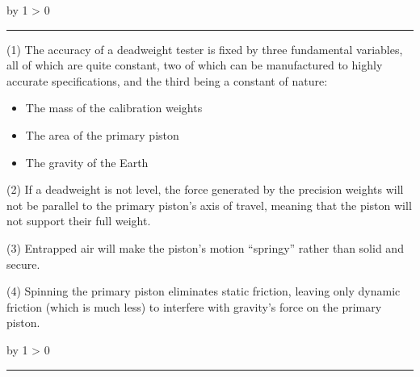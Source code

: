 \documentclass[12pt,a4paper]{article}
\def\svar{
           \advance\answnum by 1
           \ifnum \answnum > 0
                \hrule
                \vskip 3pt
                \leftline{Svar \the\answnum}
                \vskip 3pt \fi}
\def\notes{
           \advance\explnum by 1
           \ifnum \explnum > 0
                \hrule
                \vskip 3pt
                \leftline{Notes \the\explnum}
                \vskip 3pt \fi}
\begin{document}
\vskip 10pt \filbreak 





\svar{} 

\vskip 10pt {\narrower \noindent \baselineskip5pt

\noindent
(1) The accuracy of a deadweight tester is fixed by three fundamental variables, all of which are quite constant, two of which can be manufactured to highly accurate specifications, and the third being a constant of nature:

\begin{itemize}
\item{} The mass of the calibration weights
\item{} The area of the primary piston
\item{} The gravity of the Earth
\end{itemize}

\par} \vskip 10pt




\vskip 10pt {\narrower \noindent \baselineskip5pt

\noindent
(2) If a deadweight is not level, the force generated by the precision weights will not be parallel to the primary piston's axis of travel, meaning that the piston will not support their full weight.

\par} \vskip 10pt




\vskip 10pt {\narrower \noindent \baselineskip5pt

\noindent
(3) Entrapped air will make the piston's motion ``springy'' rather than solid and secure.

\par} \vskip 10pt




\vskip 10pt {\narrower \noindent \baselineskip5pt

\noindent
(4) Spinning the primary piston eliminates static friction, leaving only dynamic friction (which is much less) to interfere with gravity's force on the primary piston.

\par} \vskip 10pt



\vskip 10pt \filbreak 





\notes{} 
\end{document}
